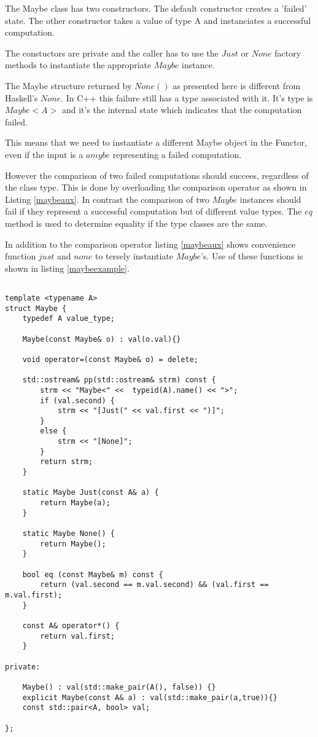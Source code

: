 \documentclass[12pt,fleqn]{article}
\begin{document}
The Maybe class has two constructors. The default constructor creates a 'failed' state. 
The other constructor takes a value of type A and instanciates a successful computation.

The constuctors are private and the caller has to use the $Just$ or $None$ factory methods to instantiate the appropriate $Maybe$ instance.

The Maybe structure returned by $None()$ as presented here is different from Haskell's $None$. 
In C++ this failure still has a type associated with it. 
It's type is $Maybe<A>$ and it's the internal state which indicates that the computation failed.

This means that we need to instantiate a different  Maybe object in the Functor, 
even if the input is a $amybe$ representing a failed computation.

However the comparison of two failed computations should succees, regardless of the class type.
This is done by overloading the comparison operator as shown in Listing \ref{maybeaux}.
In contrast the comparison of two $Maybe$ instances should fail if they represent a successful computation but of different value types.
The $eq$ method is used to determine equality if the type classes are the same.

In addition to the comparison operator listing \ref{maybeaux} shows convenience function $just$ and $none$ to tersely instantiate $Maybe$'s.
Use of these functions is shown in listing \ref{maybeexample}.
%
%
%
%
\begin{minipage}{\linewidth}
\begin{lstlisting}[caption=Implementation of the Maybe class, label=maybe]

template <typename A>
struct Maybe {
	typedef A value_type;

	Maybe(const Maybe& o) : val(o.val){}

	void operator=(const Maybe& o) = delete;

 	std::ostream& pp(std::ostream& strm) const {
		strm << "Maybe<" <<  typeid(A).name() << ">";
		if (val.second) {
			strm << "[Just(" << val.first << ")]"; 
		}
		else {
			strm << "[None]";
		}
		return strm;
	}

	static Maybe Just(const A& a) {
		return Maybe(a);
	}

	static Maybe None() {
		return Maybe();
	}

	bool eq (const Maybe& m) const {
		return (val.second == m.val.second) && (val.first == m.val.first);
	}
	
	const A& operator*() {
		return val.first;
	}

private: 

	Maybe() : val(std::make_pair(A(), false)) {}
	explicit Maybe(const A& a) : val(std::make_pair(a,true)){}
	const std::pair<A, bool> val;

};
\end{lstlisting}
\end{minipage}
%
%
%
\end{document}
